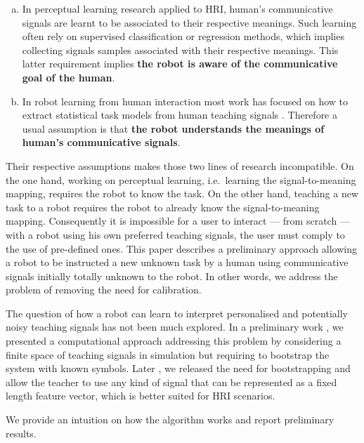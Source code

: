 \documentclass{acm_proc_article-sp}
\begin{document}
 \begin{enumerate}[(a)] 
 
 \item In perceptual learning research applied to HRI, human's communicative signals are learnt to be associated to their respective meanings. Such learning often rely on supervised classification or regression methods, which implies collecting signals samples associated with their respective meanings. This latter requirement implies \textbf{the robot is aware of the communicative goal of the human}.
 
 \item In robot learning from human interaction most work has focused on how to extract statistical task models from human teaching signals \cite{kaplan2002robotic}. Therefore a usual assumption is that \textbf{the robot understands the meanings of human's communicative signals}.
 
 \end{enumerate}
 
Their respective assumptions makes those two lines of research incompatible. On the one hand, working on perceptual learning, i.e.\ learning the signal-to-meaning mapping, requires the robot to know the task. On the other hand, teaching a new task to a robot requires the robot to already know the signal-to-meaning mapping. Consequently it is impossible for a user to interact --- from scratch --- with a robot using his own preferred teaching signals, the user must comply to the use of pre-defined ones. This paper describes a preliminary approach allowing a robot to be instructed a new unknown task by a human using communicative signals initially totally unknown to the robot. In other words, we address the problem of removing the need for calibration.

The question of how a robot can learn to interpret personalised and potentially noisy teaching signals has not been much explored. In a preliminary work \cite{lopes2011simultaneous}, we presented a computational approach addressing this problem by considering a finite space of teaching signals in simulation but requiring to bootstrap the system with known symbols. Later \cite{grizou2013robot}, we released the need for bootstrapping and allow the teacher to use any kind of signal that can be represented as a fixed length feature vector, which is better suited for HRI scenarios.

We provide an intuition on how the algorithm works and report preliminary results.
\end{document}
